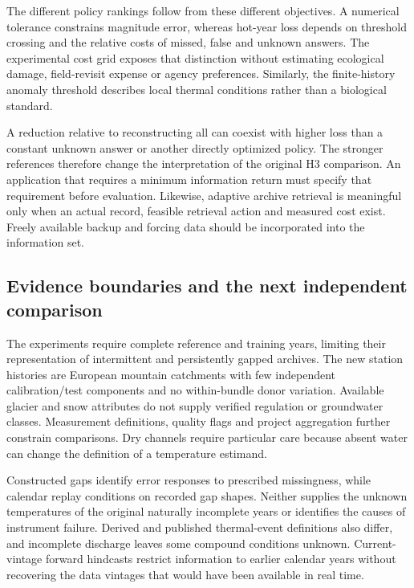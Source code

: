 The different policy rankings follow from these different objectives. A numerical tolerance constrains magnitude error, whereas hot-year loss depends on threshold crossing and the relative costs of missed, false and unknown answers. The experimental cost grid exposes that distinction without estimating ecological damage, field-revisit expense or agency preferences. Similarly, the finite-history anomaly threshold describes local thermal conditions rather than a biological standard.

A reduction relative to reconstructing all can coexist with higher loss than a constant unknown answer or another directly optimized policy. The stronger references therefore change the interpretation of the original H3 comparison. An application that requires a minimum information return must specify that requirement before evaluation. Likewise, adaptive archive retrieval is meaningful only when an actual record, feasible retrieval action and measured cost exist. Freely available backup and forcing data should be incorporated into the information set.

\subsection{Evidence boundaries and the next independent comparison}

The experiments require complete reference and training years, limiting their representation of intermittent and persistently gapped archives. The new station histories are European mountain catchments with few independent calibration/test components and no within-bundle donor variation. Available glacier and snow attributes do not supply verified regulation or groundwater classes. Measurement definitions, quality flags and project aggregation further constrain comparisons. Dry channels require particular care because absent water can change the definition of a temperature estimand.

Constructed gaps identify error responses to prescribed missingness, while calendar replay conditions on recorded gap shapes. Neither supplies the unknown temperatures of the original naturally incomplete years or identifies the causes of instrument failure. Derived and published thermal-event definitions also differ, and incomplete discharge leaves some compound conditions unknown. Current-vintage forward hindcasts restrict information to earlier calendar years without recovering the data vintages that would have been available in real time.

